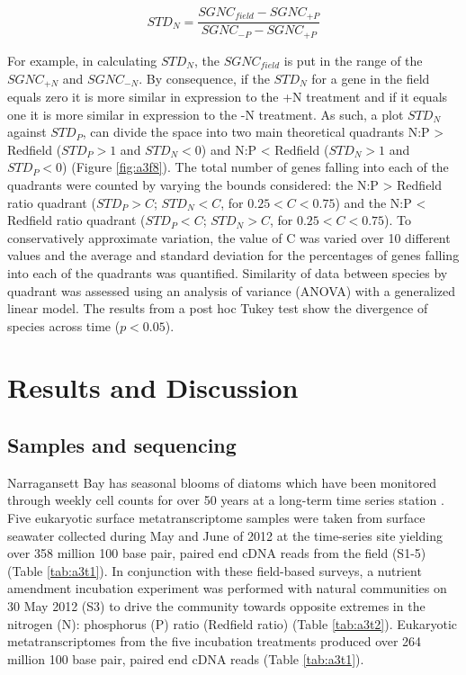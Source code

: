 \begin{equation}
	\label{eq:STDP}
	STD_N = \frac{SGNC_{field} - SGNC_{+P}}{SGNC_{-P} - SGNC_{+P}} 	
\end{equation}

For example, in calculating $STD_N$, the $SGNC_{field}$ is put in the range of the $SGNC_{+N}$ and $SGNC_{-N}$. By consequence, if the $STD_N$ for a gene in the field equals zero it is more similar in expression to the +N treatment and if it equals one it is more similar in expression to the -N treatment. As such, a plot $STD_N$ against $STD_P$, can divide the space into two main theoretical quadrants N:P > Redfield ($STD_P > 1$ and $STD_N < 0$) and N:P < Redfield ($STD_N > 1$ and $STD_P < 0$) (Figure \ref{fig:a3f8}). The total number of genes falling into each of the quadrants were counted by varying the bounds considered: the N:P > Redfield ratio quadrant ($STD_P > C$; $STD_N < C$, for $0.25 < C < 0.75$) and the N:P < Redfield ratio quadrant ($STD_P < C$; $STD_N > C$, for $0.25 < C < 0.75$). To conservatively approximate variation, the value of C was varied over 10 different values and the average and standard deviation for the percentages of genes falling into each of the quadrants was quantified. Similarity of data between species by quadrant was assessed using an analysis of variance (ANOVA) with a generalized linear model. The results from a post hoc Tukey test show the divergence of species across time ($p < 0.05$).

\section{Results and Discussion}
\subsection{Samples and sequencing}
Narragansett Bay has seasonal blooms of diatoms which have been monitored through weekly cell counts for over 50 years at a long-term time series station \citep{Borkman2009, Li1998}. Five eukaryotic surface metatranscriptome samples were taken from surface seawater collected during May and June of 2012 at the time-series site yielding over 358 million 100 base pair, paired end cDNA reads from the field (S1-5) (Table \ref{tab:a3t1}). In conjunction with these field-based surveys, a nutrient amendment incubation experiment was performed with natural communities on 30 May 2012 (S3) to drive the community towards opposite extremes in the nitrogen (N): phosphorus (P) ratio (Redfield ratio) (Table \ref{tab:a3t2}). Eukaryotic metatranscriptomes from the five incubation treatments produced over 264 million 100 base pair, paired end cDNA reads (Table \ref{tab:a3t1}).\par


